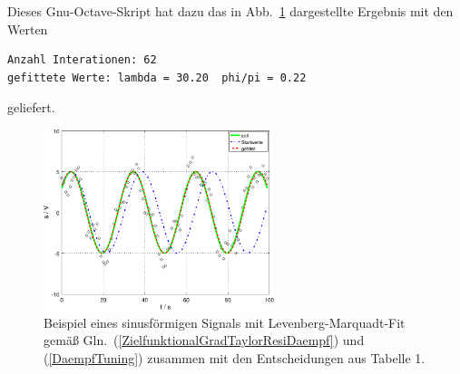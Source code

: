Dieses Gnu-Octave-Skript hat dazu das in Abb.~\ref{LSoptiExampleSinusFitted}
dargestellte Ergebnis mit den Werten
\begin{verbatim}
Anzahl Interationen: 62
gefittete Werte: lambda = 30.20  phi/pi = 0.22
\end{verbatim}
geliefert.
\begin{figure}
\begin{center}
\includegraphics[width=0.6\textwidth, angle = 0]{03_vorlesung/media/pltSS_nonlin_leastsquare_sin_zB1.pdf}
\end{center}
\caption{Beispiel eines sinusförmigen Signals mit Levenberg-Marquadt-Fit gemäß
Gln.~(\ref{ZielfunktionalGradTaylorResiDaempf}) und (\ref{DaempfTuning}) zusammen mit
den Entscheidungen aus Tabelle 1.\label{LSoptiExampleSinusFitted}}
\end{figure}

